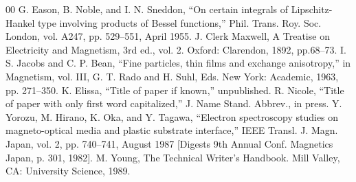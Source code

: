 \documentclass[conference]{IEEEtran}
\begin{document}
\begin{thebibliography}{00}
 G. Eason, B. Noble, and I. N. Sneddon, ``On certain integrals of Lipschitz-Hankel type involving products of Bessel functions,'' Phil. Trans. Roy. Soc. London, vol. A247, pp. 529--551, April 1955.
 J. Clerk Maxwell, A Treatise on Electricity and Magnetism, 3rd ed., vol. 2. Oxford: Clarendon, 1892, pp.68--73.
 I. S. Jacobs and C. P. Bean, ``Fine particles, thin films and exchange anisotropy,'' in Magnetism, vol. III, G. T. Rado and H. Suhl, Eds. New York: Academic, 1963, pp. 271--350.
 K. Elissa, ``Title of paper if known,'' unpublished.
 R. Nicole, ``Title of paper with only first word capitalized,'' J. Name Stand. Abbrev., in press.
 Y. Yorozu, M. Hirano, K. Oka, and Y. Tagawa, ``Electron spectroscopy studies on magneto-optical media and plastic substrate interface,'' IEEE Transl. J. Magn. Japan, vol. 2, pp. 740--741, August 1987 [Digests 9th Annual Conf. Magnetics Japan, p. 301, 1982].
 M. Young, The Technical Writer's Handbook. Mill Valley, CA: University Science, 1989.
\end{thebibliography}
\end{document}
